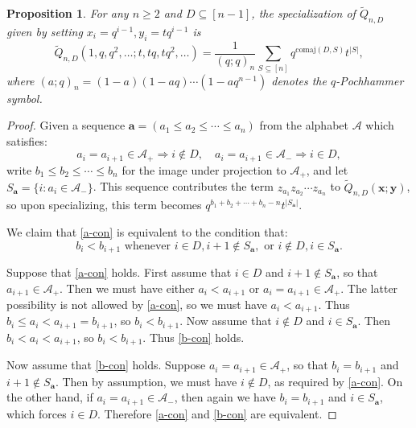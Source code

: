 \documentclass[11pt]{article}
\newtheorem{prop}[theo]{Proposition}
\theoremstyle{definition}
\numberwithin{equation}{section}
\newcommand\comaj{\mathrm{comaj}}
\newcommand\xb{\mathbf{x}}
\newcommand\yb{\mathbf{y}}
\newcommand\Acal{\mathcal{A}}
\newcommand\Qtil{\widetilde{Q}}
\begin{document}
\begin{prop}\label{prop:q-ps}
    For any $n \ge 2$ and $D \subseteq [n-1]$, the specialization of $\Qtil_{n,D}$ given by setting $x_i = q^{i-1}, y_i = tq^{i-1}$ is
    \[
    \Qtil_{n,D}(1,q,q^2,\ldots;t,tq,tq^2,\ldots) = \frac{1}{(q;q)_n} \sum_{S \subseteq [n]} q^{\comaj(D,S)}t^{|S|},
    \]
    where $(a;q)_n = (1-a)(1-aq) \cdots (1-aq^{n-1})$ denotes the $q$-Pochhammer symbol.
\end{prop}
\begin{proof}
    Given a sequence $\mathbf{a} = (a_1 \le a_2 \le \cdots \le a_n)$ from the alphabet $\Acal$ which satisfies:
    \begin{equation}\label{a-con}
a_i = a_{i+1} \in \Acal_+ \Rightarrow i \not\in D, \quad a_i = a_{i+1} \in \Acal_- \Rightarrow i \in D,
\end{equation}
write $b_1 \le b_2 \le \cdots \le b_n$ for the image under projection to $\Acal_+$, and let $S_\mathbf{a} = \{ i : a_i \in \Acal_- \}$. This sequence contributes the term $z_{a_1}z_{a_2} \cdots z_{a_n}$ to $\Qtil_{n,D}(\xb;\yb)$, so upon specializing, this term becomes $q^{b_1 + b_2 + \cdots + b_n - n}t^{|S_\mathbf{a}|}$. 

We claim that \eqref{a-con} is equivalent to the condition that:
    \begin{equation}\label{b-con}
    b_i < b_{i+1} \text{ whenever } i \in D, i+1 \not\in S_\mathbf{a}, \text{ or } i \not\in D, i \in S_\mathbf{a}.
    \end{equation}
    
    Suppose that \eqref{a-con} holds. First assume that $i \in D$ and $i+1 \not\in S_\mathbf{a}$, so that $a_{i+1} \in \Acal_+$. Then we must have either $a_i < a_{i+1}$ or $a_i = a_{i+1} \in \Acal_+$. The latter possibility is not allowed by \eqref{a-con}, so we must have $a_i < a_{i+1}$. Thus $b_i \le a_i < a_{i+1} = b_{i+1}$, so $b_i < b_{i+1}$. Now assume that $i \not\in D$ and $i \in S_\mathbf{a}$. Then $b_i < a_i < a_{i+1}$, so $b_i < b_{i+1}$. Thus \eqref{b-con} holds.
    
    Now assume that \eqref{b-con} holds. Suppose $a_i = a_{i+1} \in \Acal_+$, so that $b_i = b_{i+1}$ and $i+1 \not\in S_\mathbf{a}$. Then by assumption, we must have $i \not\in D$, as required by \eqref{a-con}. On the other hand, if $a_i = a_{i+1} \in \Acal_-$, then again we have $b_i = b_{i+1}$ and $i \in S_\mathbf{a}$, which forces $i \in D$. Therefore \eqref{a-con} and \eqref{b-con} are equivalent.


\end{proof}
\end{document}
